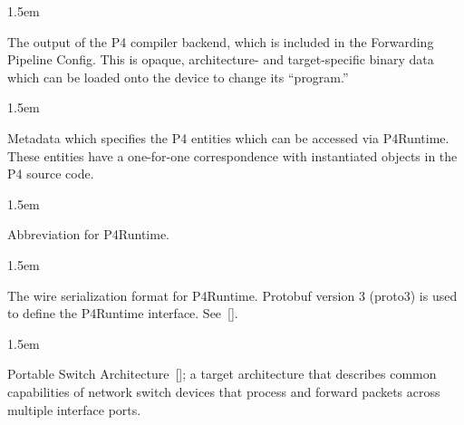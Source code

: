 \documentclass[11pt]{article}
\begin{document}
{\begin{mddefinitions}
\begin{mdbmarginx}{}{}{}{1.5em}%
\begin{mddefdata}%
The output of the P4 compiler backend, which is included in the Forwarding
Pipeline Config. This is opaque, architecture- and target-specific binary
data which can be loaded onto the device to change its \textquotedblleft{}program.\textquotedblright{}
\end{mddefdata}%
\end{mdbmarginx}%


\begin{mdbmarginx}{}{}{}{1.5em}%
\begin{mddefdata}%
Metadata which specifies the P4 entities which can be accessed via
P4Runtime. These entities have a one-for-one correspondence with
instantiated objects in the P4 source code.
\end{mddefdata}%
\end{mdbmarginx}%


\begin{mdbmarginx}{}{}{}{1.5em}%
\begin{mddefdata}%
Abbreviation for P4Runtime.
\end{mddefdata}%
\end{mdbmarginx}%


\begin{mdbmarginx}{}{}{}{1.5em}%
\begin{mddefdata}%
The wire serialization format for P4Runtime. Protobuf version 3 (proto3) is
used to define the P4Runtime interface. See~[].
\end{mddefdata}%
\end{mdbmarginx}%


\begin{mdbmarginx}{}{}{}{1.5em}%
\begin{mddefdata}%
Portable Switch Architecture~[]; a target architecture that describes
common capabilities of network switch devices that process and forward
packets across multiple interface ports.
\end{mddefdata}%
\end{mdbmarginx}%


\end{mddefinitions}}
\end{document}
